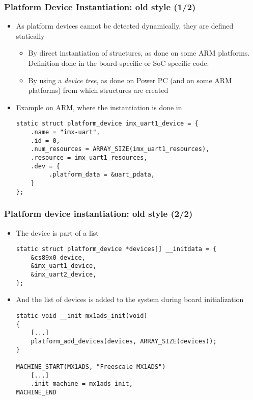 \begin{frame}[fragile]
  \frametitle{Platform Device Instantiation: old style (1/2)}
  \begin{itemize}
  \item As platform devices cannot be detected dynamically, they are
    defined statically
    \begin{itemize}
    \item By direct instantiation of 
      structures, as done on some ARM platforms. Definition done in
      the board-specific or SoC specific code.
    \item By using a \emph{device tree}, as done on Power PC (and on
      some ARM platforms) from which 
      structures are created
    \end{itemize}
  \item Example on ARM, where the instantiation is done in
\begin{verbatim}
static struct platform_device imx_uart1_device = {
    .name = "imx-uart",
    .id = 0,
    .num_resources = ARRAY_SIZE(imx_uart1_resources),
    .resource = imx_uart1_resources,
    .dev = {
         .platform_data = &uart_pdata,
    }
};
\end{verbatim}
\end{itemize}
\end{frame}

\begin{frame}[fragile]
  \frametitle{Platform device instantiation: old style (2/2)}
  \begin{itemize}
  \item The device is part of a list
  \begin{verbatim}
static struct platform_device *devices[] __initdata = {
    &cs89x0_device,
    &imx_uart1_device,
    &imx_uart2_device,
};
  \end{verbatim}
  \item And the list of devices is added to the system during
    board initialization
  \begin{verbatim}
static void __init mx1ads_init(void)
{
    [...]
    platform_add_devices(devices, ARRAY_SIZE(devices));
}

MACHINE_START(MX1ADS, "Freescale MX1ADS")
    [...]
    .init_machine = mx1ads_init,
MACHINE_END
  \end{verbatim}
  \end{itemize}
\end{frame}

